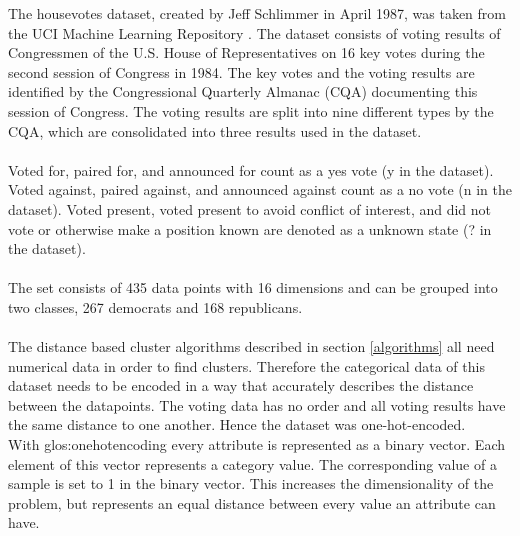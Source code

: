 
The housevotes dataset, created by Jeff Schlimmer in April 1987, was taken from the UCI Machine Learning Repository \cite{Dua2019}. The dataset consists of voting results of Congressmen of the U.S. House of Representatives on 16 key votes during the second session of Congress in 1984. The key votes and the voting results are identified by the Congressional Quarterly Almanac (CQA) documenting this session of Congress. The voting results are split into nine different types by the CQA, which are consolidated into three results used in the dataset.\\
\ \\
Voted for, paired for, and announced for count as a yes vote (y in the dataset).
Voted against, paired against, and announced against count as a no vote (n in the dataset).
Voted present, voted present to avoid conflict of interest, and did not vote or otherwise make a position known are denoted as a unknown state (? in the dataset).\\
\ \\
The set consists of 435 data points with 16 dimensions and can be grouped into two classes, 267 democrats and 168 republicans.\\
\ \\
The distance based cluster algorithms described in section \ref{algorithms} all need numerical data in order to find clusters. Therefore the categorical data of this dataset needs to be encoded in a way that accurately describes the distance between the datapoints. The voting data has no order and all voting results have the same distance to one another. Hence the dataset was one-hot-encoded.\\
With \Gls{glos:onehotencoding} every attribute is represented as a binary vector. Each element of this vector represents a category value. The corresponding value of a sample is set to 1 in the binary vector. 
This increases the dimensionality of the problem, but represents an equal distance between every value an attribute can have.\\

